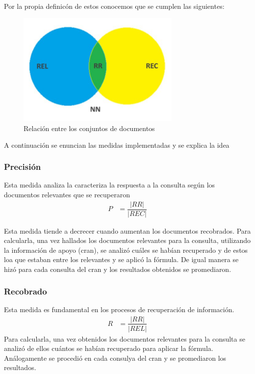 \documentclass[runningheads]{llncs}
\begin{document}
	Por la propia definic\'on de estos conocemos que se cumplen las siguientes:
	\begin{figure}[h]
		\begin{center}
			\includegraphics[width =8.0cm]{Diagrama.png}
			\caption[Fig 3]{Relación entre los conjuntos de documentos}		
		\end{center}
	\end{figure}
	
	A continuaci\'on se enuncian las medidas implementadas y se explica la idea
\subsubsection{Precisi\'on }

	Esta medida analiza la caracteriza la respuesta a la consulta seg\'un los documentos relevantes que se recuperaron
	\begin{align*}
	P&=\dfrac{|RR|}{|REC|}
	\end{align*}
	
	Esta medida tiende a decrecer cuando aumentan los documentos recobrados. Para calcularla, una vez hallados los documentos relevantes para la consulta, utilizando la informaci\'on de apoyo (cran), se analiz\'o cu\'ales se hab\'ian recuperado y de estos loa que estaban entre los relevantes y se aplic\'o la f\'ormula. De igual manera se hiz\'o para cada consulta del cran y los resultados obtenidos se promediaron. 

\subsubsection{Recobrado}

Esta medida es fundamental en los procesos de recuperación de información.
	\begin{align*}
	R&=\dfrac{|RR|}{|REL|}
	\end{align*}
	Para calcularla, una vez obtenidos los documentos relevantes para la consulta se analizó de ellos cuántos se habían recuperado para aplicar la fórmula. Análogamente se procedió en cada consulya del cran y se promediaron los resultados.
\end{document}
